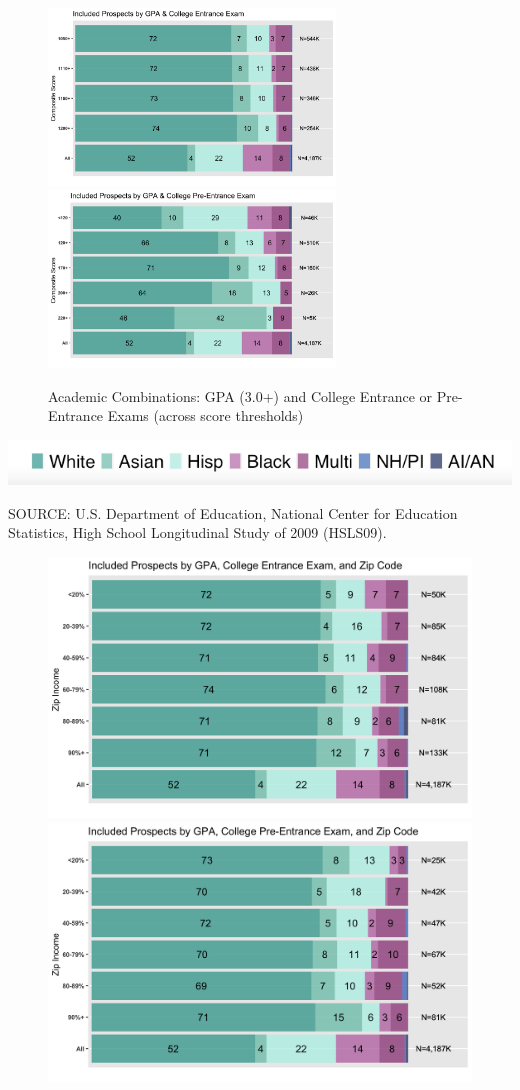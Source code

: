 \documentclass[
  12pt,
]{article}
\begin{document}
\begin{landscape}



\begin{figure}

{\centering \includegraphics[width=3in]{./../../outputs/figures/combo1_inc_satv2} \includegraphics[width=3in]{./../../outputs/figures/combo1_inc_psatv2} 

}

\caption{Academic Combinations: GPA (3.0+) and College Entrance or Pre-Entrance Exams (across score thresholds)}\label{fig:gpa-sat-psat}
\end{figure}


\begin{center}\includegraphics[width=0.32\linewidth]{./../../outputs/figures/legend_horizontal} \end{center}

\begingroup
\fontsize{8}{8}\selectfont
SOURCE: U.S. Department of Education, National Center for Education Statistics, High School Longitudinal Study of 2009 (HSLS09).
\endgroup

\pagebreak


\begin{figure}

{\centering \includegraphics[width=0.35\linewidth]{./../../outputs/figures/combo2_inc_satV2} \includegraphics[width=0.35\linewidth]{./../../outputs/figures/combo2_inc_psatV2} 

}
\end{figure}
\end{landscape}
\end{document}
